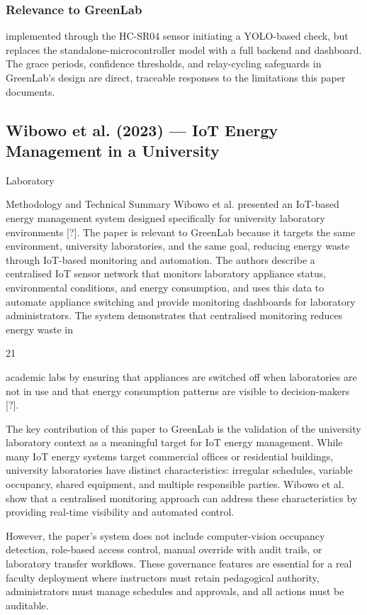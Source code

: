 \subsubsection*{Relevance to GreenLab}

implemented through the HC-SR04 sensor initiating a YOLO-based check, but replaces
the standalone-microcontroller model with a full backend and dashboard. The grace periods, conﬁdence thresholds, and relay-cycling safeguards in GreenLab's design are direct,
traceable responses to the limitations this paper documents.



\subsection{Wibowo et al. (2023) --- IoT Energy Management in a University}

Laboratory

Methodology and Technical Summary Wibowo et al. presented an IoT-based energy
management system designed speciﬁcally for university laboratory environments [?]. The
paper is relevant to GreenLab because it targets the same environment, university laboratories, and the same goal, reducing energy waste through IoT-based monitoring and automation. The authors describe a centralised IoT sensor network that monitors laboratory
appliance status, environmental conditions, and energy consumption, and uses this data to
automate appliance switching and provide monitoring dashboards for laboratory administrators. The system demonstrates that centralised monitoring reduces energy waste in

21


academic labs by ensuring that appliances are switched off when laboratories are not in use
and that energy consumption patterns are visible to decision-makers [?].

The key contribution of this paper to GreenLab is the validation of the university laboratory context as a meaningful target for IoT energy management. While many IoT energy
systems target commercial ofﬁces or residential buildings, university laboratories have distinct characteristics: irregular schedules, variable occupancy, shared equipment, and multiple responsible parties. Wibowo et al. show that a centralised monitoring approach can
address these characteristics by providing real-time visibility and automated control.

However, the paper's system does not include computer-vision occupancy detection,
role-based access control, manual override with audit trails, or laboratory transfer workﬂows. These governance features are essential for a real faculty deployment where instructors must retain pedagogical authority, administrators must manage schedules and approvals, and all actions must be auditable.

